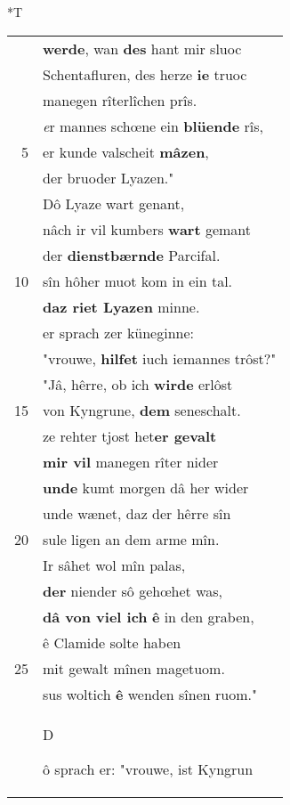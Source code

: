 \documentclass[8pt,a4paper,notitlepage]{article}
\begin{document}
\begin{table}[ht]
\begin{minipage}[t]{0.5\linewidth}
\end{minipage}
\hspace{0.5cm}
\begin{minipage}[t]{0.5\linewidth}
\small
\begin{center}*T
\end{center}
\begin{tabular}{rl}
 & \textbf{werde}, wan \textbf{des} hant mir sluoc\\ 
 & Schentafluren, des herze \textbf{ie} truoc\\ 
 & manegen rîterlîchen prîs.\\ 
 & \textit{e}r mannes schœne ein \textbf{blüende} rîs,\\ 
5 & er kunde valscheit \textbf{mâzen},\\ 
 & der bruoder Lyazen."\\ 
 & Dô Lyaze wart genant,\\ 
 & nâch ir vil kumbers \textbf{wart} gemant\\ 
 & der \textbf{dienstbærnde} Parcifal.\\ 
10 & sîn hôher muot kom in ein tal.\\ 
 & \textbf{daz riet Lyazen} minne.\\ 
 & er sprach zer küneginne:\\ 
 & "vrouwe, \textbf{hilfet} iuch iemannes trôst?"\\ 
 & "Jâ, hêrre, ob ich \textbf{wirde} erlôst\\ 
15 & von Kyngrune, \textbf{dem} seneschalt.\\ 
 & ze rehter tjost het\textbf{er gevalt}\\ 
 & \textbf{mir vil} manegen rîter nider\\ 
 & \textbf{unde} kumt morgen dâ her wider\\ 
 & unde wænet, daz der hêrre sîn\\ 
20 & sule ligen an dem arme mîn.\\ 
 & Ir sâhet wol mîn palas,\\ 
 & \textbf{der} niender sô gehœhet was,\\ 
 & \textbf{dâ von viel ich} \textbf{ê} in den graben,\\ 
 & ê Clamide solte haben\\ 
25 & mit gewalt mînen magetuom.\\ 
 & sus woltich \textbf{ê} wenden sînen ruom."\\ 
 & \begin{large}D\end{large}ô sprach er: "vrouwe, ist Kyngrun\\ 

\end{tabular}
\end{minipage}
\end{table}
\end{document}
